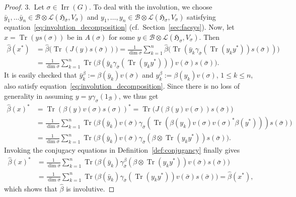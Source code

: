 \documentclass[pdftex]{sigma}
\numberwithin{equation}{section}
\newcommand*{\tensor}{\otimes}		%
\DeclareMathOperator{\Tr}{Tr}		%
\newcommand*{\hilb}{\mathfrak}		%
\newcommand*{\alg}{\mathcal}		%
\newcommand*{\hH}{\hilb{H}}			%
\newcommand*{\one}{1}				%
\newcommand*{\aB}{\alg{B}} 			%
\newcommand*{\End}{\mathcal{L}} %
\DeclareMathOperator{\Irrep}{Irr} 			%
\begin{document}
\begin{proof}
3.~Let $\sigma \in \Irrep(G)$.
		To deal with the involution, we choose $\bar y_1, \dots \bar y_n \in \aB \tensor \End(\hH_{\bar\sigma}, V_{\bar\sigma})$ and $y_1, \dots, y_n \in \aB \tensor \End(\hH_\sigma, V_\sigma)$ satisfying equation~\eqref{eq:involution_decomposition} (cf.~Section~\ref{sec:facsys}).
		Now, let $x = \Tr ( y s(\sigma) )$ be in $A(\sigma)$ for some $y \in \aB \tensor \End(\hH_\sigma, V_\sigma)$.
		Then
		\begin{align*}
			\hat\beta(x^*)
			&= \hat\beta \bigl( \Tr ( J(y) s(\bar \sigma) ) \bigr)
			= \frac{1}{\dim \sigma} \sum_{k=1}^n \hat\beta \bigl( \Tr ( \bar y_k \gamma_{\bar\sigma} (\Tr(y_k y^*) ) s(\bar \sigma) ) \bigr)
			\\
			&=
			\frac{1}{\dim \sigma} \sum_{k=1}^n \Tr \bigl( \beta ( \bar y_k \gamma_{\bar \sigma} ( \Tr(y_k y^*) ) ) v(\bar \sigma) s(\bar\sigma) \bigr).
		\end{align*}
		It is easily checked that $\bar y_k^\beta := \beta(\bar y_k) v(\bar\sigma)$ and $y_k^\beta := \beta(y_k)v(\sigma)$, $1 \le k \le n$, also satisfy equation~\eqref{eq:involution_decomposition}.
		Since there is no loss of generality in assuming $y = y \gamma_\sigma(\one_\aB)$, we thus get
		\begin{align*}
			\hat\beta(x)^*
			&= \Tr ( \beta(y) v(\sigma) s(\sigma) )^*
			= \Tr \bigl( J ( \beta(y) v(\sigma) ) s(\bar\sigma) \bigr)
			\\
			&=
			\frac{1}{\dim \sigma} \sum_{k=1}^n \Tr \bigl( \beta(\bar y_k) v(\bar\sigma) \gamma_{\bar\sigma} ( \Tr ( \beta(y_k) v(\sigma) v(\sigma)^* \beta(y^*) ) ) s(\bar \sigma) \bigr)
			\\
			&=
			\frac{1}{\dim \sigma} \sum_{k=1}^n \Tr \bigl( \beta(\bar y_k) v(\bar\sigma) \gamma_{\bar\sigma} ( \beta \tensor \Tr( y_k y^*) ) s(\bar \sigma) \bigr).
		\end{align*}
		Invoking the conjugacy equations in Definition~\ref{def:conjugancy} finally gives
		\begin{align*}
			\hat\beta(x)^*
			&=
			\frac{1}{\dim \sigma} \sum_{k=1}^n \Tr \bigl( \beta(\bar y_k) \gamma^\beta_{\bar\sigma} ( \beta \tensor \Tr( y_k y^*) ) v(\bar\sigma) s(\bar \sigma) \bigr)
			\\
			&=
			\frac{1}{\dim \sigma} \sum_{k=1}^n \Tr \bigl( \beta ( \bar y_k) \gamma_{\bar\sigma}( \Tr( y_k y^*) ) v(\bar\sigma) s(\bar \sigma)\bigr)
			= \hat\beta(x^*),
		\end{align*}
		which shows that $\hat \beta$ is involutive.
\end{proof}
\end{document}

